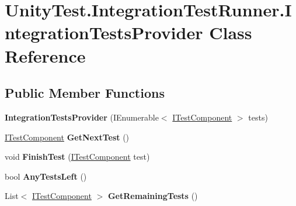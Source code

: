 \hypertarget{class_unity_test_1_1_integration_test_runner_1_1_integration_tests_provider}{}\section{Unity\+Test.\+Integration\+Test\+Runner.\+Integration\+Tests\+Provider Class Reference}
\label{class_unity_test_1_1_integration_test_runner_1_1_integration_tests_provider}
\subsection*{Public Member Functions}
\begin{DoxyCompactItemize}
\item 
\mbox{\label{class_unity_test_1_1_integration_test_runner_1_1_integration_tests_provider_aaf97aee49704feaea6ff66638f69f1c9}} 
{\bfseries Integration\+Tests\+Provider} (I\+Enumerable$<$ \hyperlink{interface_unity_test_1_1_i_test_component}{I\+Test\+Component} $>$ tests)
\item 
\mbox{\label{class_unity_test_1_1_integration_test_runner_1_1_integration_tests_provider_ac1ce9954ba922eb9add1814ad79dca9d}} 
\hyperlink{interface_unity_test_1_1_i_test_component}{I\+Test\+Component} {\bfseries Get\+Next\+Test} ()
\item 
\mbox{\label{class_unity_test_1_1_integration_test_runner_1_1_integration_tests_provider_a34da204aa783c5d34b9d67d56fa28a6e}} 
void {\bfseries Finish\+Test} (\hyperlink{interface_unity_test_1_1_i_test_component}{I\+Test\+Component} test)
\item 
\mbox{\label{class_unity_test_1_1_integration_test_runner_1_1_integration_tests_provider_a27e1849b4025f6c60cc9c660c6ff0ec2}} 
bool {\bfseries Any\+Tests\+Left} ()
\item 
\mbox{\label{class_unity_test_1_1_integration_test_runner_1_1_integration_tests_provider_a3886421131d572e82b8f40fecbd77486}} 
List$<$ \hyperlink{interface_unity_test_1_1_i_test_component}{I\+Test\+Component} $>$ {\bfseries Get\+Remaining\+Tests} ()
\end{DoxyCompactItemize}
